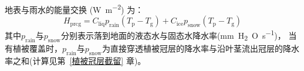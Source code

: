 地表与雨水的能量交换 (\unit{W.m^{-2}}) 为：
\begin{equation}
  H_{\mathrm{p r c g}}=C_{\mathrm{liq}} p_{\mathrm {rain}}\left(T_{\mathrm{p}}-T_{\mathrm{g}}\right)+C_{\mathrm{ice}} p_{\mathrm {snow}}\left(T_{\mathrm{p}}-T_{\mathrm{g}}\right)
\end{equation}
其中$p_{\mathrm {rain}}$与$p_{\mathrm {snow}}$分别表示落到地面的液态水与固态水降水率(\unit{mm.H_2O.s^{-1}})，
当有植被覆盖时，$p_{\mathrm {rain}}$与$p_{\mathrm {snow}}$为直接穿透植被冠层的降水率与沿叶茎流出冠层的降水率之和(计算见第~\ref{植被冠层截留} 章)。
